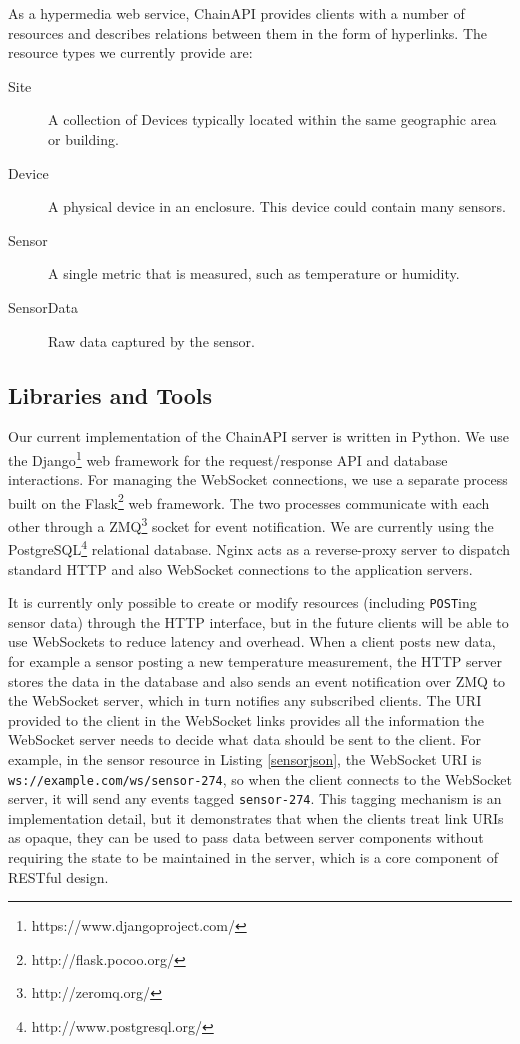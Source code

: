 \documentclass{acm_proc_article-sp}
\begin{document}
As a hypermedia web service, ChainAPI provides clients with a number of
resources and describes relations between them in the form of hyperlinks.  The
resource types we currently provide are:

\begin{description}
    \item[Site] A collection of Devices typically located within the same
        geographic area or building.
    \item[Device] A physical device in an enclosure. This device could contain
        many sensors.
    \item[Sensor] A single metric that is measured, such as temperature or humidity.
    \item[SensorData] Raw data captured by the sensor.
\end{description}

\subsection{Libraries and Tools}

Our current implementation of the ChainAPI server is written in Python. We use
the Django\footnote{https://www.djangoproject.com/} web framework for the
request/response API and database interactions. For managing the WebSocket
connections, we use a separate process built on the
Flask\footnote{http://flask.pocoo.org/} web framework. The two processes
communicate with each other through a ZMQ\footnote{http://zeromq.org/} socket
for event notification. We are currently using the
PostgreSQL\footnote{http://www.postgresql.org/} relational database. Nginx acts
as a reverse-proxy server to dispatch standard HTTP and also WebSocket
connections to the application servers.

It is currently only possible to create or modify resources (including
\texttt{POST}ing sensor data) through the HTTP interface, but in the future clients
will be able to use WebSockets to reduce latency and overhead. When a client
posts new data, for example a sensor posting a new temperature measurement, the
HTTP server stores the data in the database and also sends an event
notification over ZMQ to the WebSocket server, which in turn notifies any
subscribed clients. The URI provided to the client in the WebSocket links
provides all the information the WebSocket server needs to decide what data
should be sent to the client. For example, in the sensor resource in Listing
\ref{sensorjson}, the WebSocket URI is \texttt{ws://example.com/ws/sensor-274},
so when the client connects to the WebSocket server, it will send any events
tagged \texttt{sensor-274}. This tagging mechanism is an implementation detail,
but it demonstrates that when the clients treat link URIs as opaque, they can
be used to pass data between server components without requiring the state to
be maintained in the server, which is a core component of RESTful design.
\end{document}
